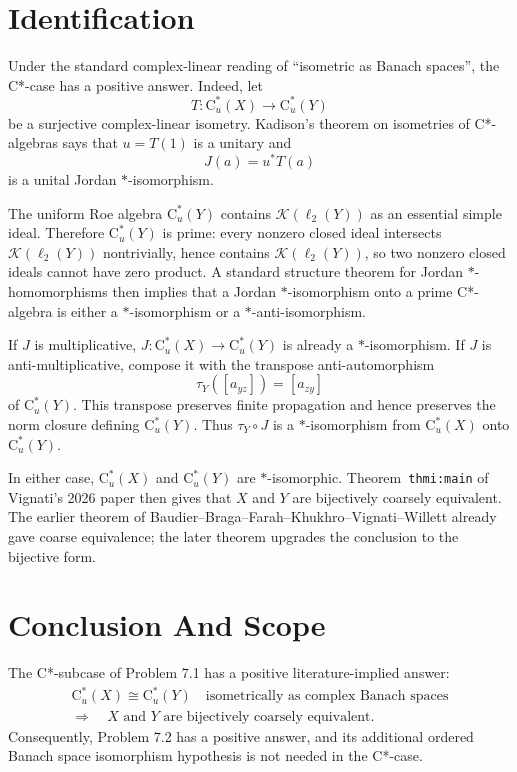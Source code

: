\documentclass[11pt]{article}
\newcommand{\Cu}{\mathrm{C}^*_u}
\newcommand{\K}{\mathcal K}
\newcommand{\elltwo}{\ell_2}
\begin{document}
\section*{Identification}

Under the standard complex-linear reading of ``isometric as Banach spaces'', the C*-case has a positive answer.  Indeed, let
\[
  T:\Cu(X)\to \Cu(Y)
\]
be a surjective complex-linear isometry.  Kadison's theorem on isometries of C*-algebras says that $u=T(1)$ is a unitary and
\[
  J(a)=u^*T(a)
\]
is a unital Jordan $*$-isomorphism.

The uniform Roe algebra $\Cu(Y)$ contains $\K(\elltwo(Y))$ as an essential simple ideal.  Therefore $\Cu(Y)$ is prime: every nonzero closed ideal intersects $\K(\elltwo(Y))$ nontrivially, hence contains $\K(\elltwo(Y))$, so two nonzero closed ideals cannot have zero product.  A standard structure theorem for Jordan $*$-homomorphisms then implies that a Jordan $*$-isomorphism onto a prime C*-algebra is either a $*$-isomorphism or a $*$-anti-isomorphism.

If $J$ is multiplicative, $J:\Cu(X)\to \Cu(Y)$ is already a $*$-isomorphism.  If $J$ is anti-multiplicative, compose it with the transpose anti-automorphism
\[
  \tau_Y([a_{yz}])=[a_{zy}]
\]
of $\Cu(Y)$.  This transpose preserves finite propagation and hence preserves the norm closure defining $\Cu(Y)$.  Thus $\tau_Y\circ J$ is a $*$-isomorphism from $\Cu(X)$ onto $\Cu(Y)$.

In either case, $\Cu(X)$ and $\Cu(Y)$ are $*$-isomorphic.  Theorem~\texttt{thmi:main} of Vignati's 2026 paper then gives that $X$ and $Y$ are bijectively coarsely equivalent.  The earlier theorem of Baudier--Braga--Farah--Khukhro--Vignati--Willett already gave coarse equivalence; the later theorem upgrades the conclusion to the bijective form.

\section*{Conclusion And Scope}

The C*-subcase of Problem 7.1 has a positive literature-implied answer:
\[
  \begin{gathered}
  \Cu(X)\cong \Cu(Y)\quad\text{isometrically as complex Banach spaces}\\
  \Longrightarrow\quad
  X \text{ and } Y \text{ are bijectively coarsely equivalent.}
  \end{gathered}
\]
Consequently, Problem 7.2 has a positive answer, and its additional ordered Banach space isomorphism hypothesis is not needed in the C*-case.
\end{document}
